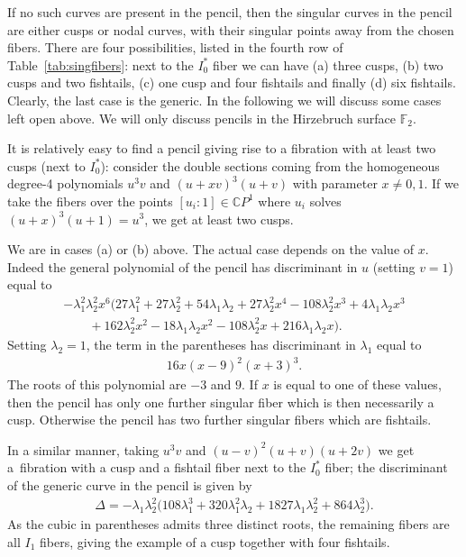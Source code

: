 \documentclass[10pt,a4paper]{amsart}
\newcommand{\CP}[1]{\mathbb{C}P^{#1}} %
\numberwithin{equation}{section}
\begin{document}
If no such curves are present in the pencil, then the singular curves
in the pencil are either cusps or nodal curves, with their singular
points away from the chosen fibers. There are four possibilities, listed in the
fourth row of Table~\ref{tab:singfibers}: next
to the $I_0^*$ fiber we can have (a) three cusps, (b) two cusps and two
fishtails, (c) one cusp and four fishtails and finally (d) six
fishtails. Clearly, the last case is the generic. In the following
we will discuss some cases left open above. We will only discuss
pencils in the Hirzebruch surface ${\mathbb {F}}_2$.

\begin{Example}
It is relatively easy to find a pencil giving rise to a fibration with
at least two cusps (next to $I_0^*$): consider the double sections coming from the
homogeneous degree-4 polynomials $u^3v$ and $(u+xv)^3(u+v)$ with parameter $x\neq 0,1$.
If we take the fibers over the points $[u_i:1]\in \CP{1}$ where
$u_i$ solves $(u+x)^3(u+1)=u^3$, we get at least two cusps.

We are in cases (a) or (b) above. The actual case depends on the value
of $x$. Indeed the general polynomial of the pencil has discriminant
in $u$ (setting $v=1$) equal to
\begin{gather*}
-\lambda _1^2 \lambda _2^2 x^6 \big(27 \lambda _1^2+27 \lambda _2^2+54 \lambda _1 \lambda _2+27 \lambda _2^2 x^4-108 \lambda _2^2 x^3+4 \lambda _1 \lambda _2 x^3 \\
\qquad{} +162 \lambda _2^2 x^2-18 \lambda _1 \lambda _2 x^2-108 \lambda _2^2 x+216 \lambda _1 \lambda _2 x\big).
\end{gather*}
Setting $\lambda _2=1$, the term in the parentheses has discriminant in $\lambda_1$ equal to
\begin{gather*}
	16 x (x-9)^2 (x+3)^3.
\end{gather*}
The roots of this polynomial are $-3$ and $9$. If $x$ is equal to one of these values, then the pencil has only one further singular fiber which is then necessarily a cusp. Otherwise the pencil has two further singular fibers which are fishtails.
\end{Example}

\begin{Example} In a similar manner, taking $u^3v$ and $(u-v)^2(u+v)(u+2v)$ we get a~fibration with a cusp and a fishtail fiber next to the $I_0^*$ fiber;
the discriminant of the generic curve in the pencil is given by
\begin{gather*}
 \Delta = - \lambda_1 \lambda_2^2 \big(108 \lambda_1^3 + 320 \lambda_1^2 \lambda_2 + 1827 \lambda_1 \lambda_2^2 + 864 \lambda_2^3\big).
\end{gather*}
As the cubic in parentheses admits three distinct roots, the remaining fibers are all $I_1$ fibers, giving the example of a cusp together with four fishtails.
\end{Example}
\end{document}

